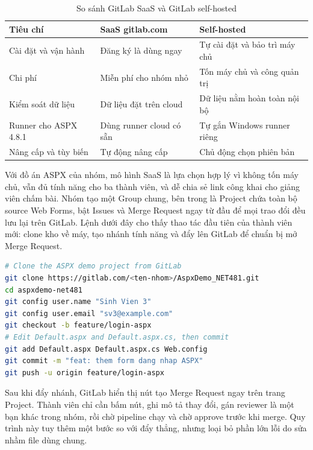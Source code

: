 \begin{table}[H]
\centering
\caption{So sánh GitLab SaaS và GitLab self-hosted}
\label{tab:c51-saas-selfhosted}
\begin{tabular}{lll}
\toprule
Tiêu chí & SaaS gitlab.com & Self-hosted \\
\midrule
Cài đặt và vận hành & Đăng ký là dùng ngay & Tự cài đặt và bảo trì máy chủ \\
Chi phí & Miễn phí cho nhóm nhỏ & Tốn máy chủ và công quản trị \\
Kiểm soát dữ liệu & Dữ liệu đặt trên cloud & Dữ liệu nằm hoàn toàn nội bộ \\
Runner cho ASPX 4.8.1 & Dùng runner cloud có sẵn & Tự gắn Windows runner riêng \\
Nâng cấp và tùy biến & Tự động nâng cấp & Chủ động chọn phiên bản \\
\bottomrule
\end{tabular}
\end{table}

Với đồ án ASPX của nhóm, mô hình SaaS là lựa chọn hợp lý vì không tốn máy chủ,
vẫn đủ tính năng cho ba thành viên, và dễ chia sẻ link công khai cho giảng viên chấm bài.
Nhóm tạo một Group chung, bên trong là Project chứa toàn bộ source Web Forms,
bật Issues và Merge Request ngay từ đầu để mọi trao đổi đều lưu lại trên GitLab.
Lệnh dưới đây cho thấy thao tác đầu tiên của thành viên mới: clone kho về máy,
tạo nhánh tính năng và đẩy lên GitLab để chuẩn bị mở Merge Request.

\begin{lstlisting}[language=bash, caption={Clone kho ASPX và đẩy nhánh tính năng lên GitLab}, label={lst:c51-clone-push}]
# Clone the ASPX demo project from GitLab
git clone https://gitlab.com/<ten-nhom>/AspxDemo_NET481.git
cd aspxdemo-net481
git config user.name "Sinh Vien 3"
git config user.email "sv3@example.com"
git checkout -b feature/login-aspx
# Edit Default.aspx and Default.aspx.cs, then commit
git add Default.aspx Default.aspx.cs Web.config
git commit -m "feat: them form dang nhap ASPX"
git push -u origin feature/login-aspx
\end{lstlisting}

Sau khi đẩy nhánh, GitLab hiển thị nút tạo Merge Request ngay trên trang Project.
Thành viên chỉ cần bấm nút, ghi mô tả thay đổi, gán reviewer là một bạn khác trong nhóm,
rồi chờ pipeline chạy và chờ approve trước khi merge.
Quy trình này tuy thêm một bước so với đẩy thẳng, nhưng loại bỏ phần lớn lỗi do sửa nhầm file dùng chung.

